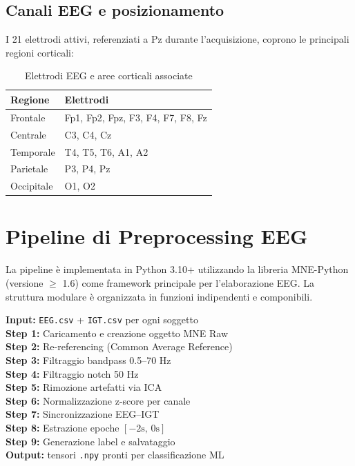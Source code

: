 \documentclass[12pt, a4paper]{article}
\begin{document}
\subsection{Canali EEG e posizionamento}

I 21 elettrodi attivi, referenziati a Pz durante l'acquisizione, coprono le principali regioni corticali:

\begin{table}[h!]
\centering
\caption{Elettrodi EEG e aree corticali associate}
\begin{tabular}{ll}
\toprule
\textbf{Regione} & \textbf{Elettrodi} \\
\midrule
Frontale & Fp1, Fp2, Fpz, F3, F4, F7, F8, Fz \\
Centrale & C3, C4, Cz \\
Temporale & T4, T5, T6, A1, A2 \\
Parietale & P3, P4, Pz \\
Occipitale & O1, O2 \\
\bottomrule
\end{tabular}
\end{table}

\section{Pipeline di Preprocessing EEG}

La pipeline è implementata in Python 3.10+ utilizzando la libreria MNE-Python (versione $\geq$ 1.6) come framework principale per l'elaborazione EEG. La struttura modulare è organizzata in funzioni indipendenti e componibili.

\begin{notabox}
\textbf{Input:} \texttt{EEG.csv} + \texttt{IGT.csv} per ogni soggetto\\[4pt]
\textbf{Step 1:} Caricamento e creazione oggetto MNE Raw\\
\textbf{Step 2:} Re-referencing (Common Average Reference)\\
\textbf{Step 3:} Filtraggio bandpass 0.5--70 Hz\\
\textbf{Step 4:} Filtraggio notch 50 Hz\\
\textbf{Step 5:} Rimozione artefatti via ICA\\
\textbf{Step 6:} Normalizzazione z-score per canale\\
\textbf{Step 7:} Sincronizzazione EEG--IGT\\
\textbf{Step 8:} Estrazione epoche $[-2\text{s},\, 0\text{s}]$\\
\textbf{Step 9:} Generazione label e salvataggio\\[4pt]
\textbf{Output:} tensori \texttt{.npy} pronti per classificazione ML
\end{notabox}
\end{document}
